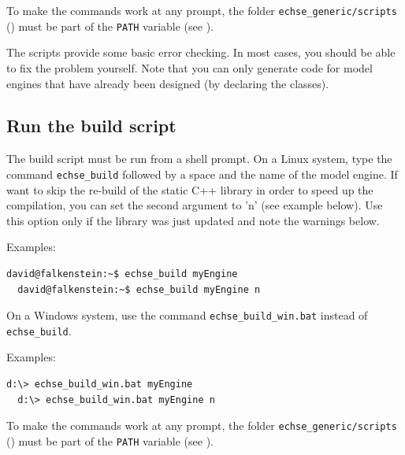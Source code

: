 \medskip
To make the commands work at any prompt, the folder \verb!echse_generic/scripts! () must be part of the \verb!PATH! variable (see ).

The scripts provide some basic error checking. In most cases, you should be able to fix the problem yourself. Note that you can only generate code for model engines that have already been designed (by declaring the classes).

\subsection{Run the build script}
The build script must be run from a shell prompt. On a Linux system, type the command \verb!echse_build! followed by a space and the name of the model engine. If want to skip the re-build of the static C++ library in order to speed up the compilation, you can set the second argument to 'n' (see example below). Use this option only if the library was just updated and note the warnings below.

\medskip
\begin{minipage}{0.3\textwidth}
  Examples:
\end{minipage}
\begin{minipage}{0.6\textwidth}
\begin{lstlisting}[style=shell]
  david@falkenstein:~$ echse_build myEngine
  david@falkenstein:~$ echse_build myEngine n
\end{lstlisting}
\end{minipage}

On a Windows system, use the command  \verb!echse_build_win.bat! instead of \verb!echse_build!.

\medskip
\begin{minipage}{0.3\textwidth}
  Examples:
\end{minipage}
\begin{minipage}{0.6\textwidth}
\begin{lstlisting}[style=shell]
  d:\> echse_build_win.bat myEngine
  d:\> echse_build_win.bat myEngine n
\end{lstlisting}
\end{minipage}

\medskip
To make the commands work at any prompt, the folder \verb!echse_generic/scripts! () must be part of the \verb!PATH! variable (see ).

